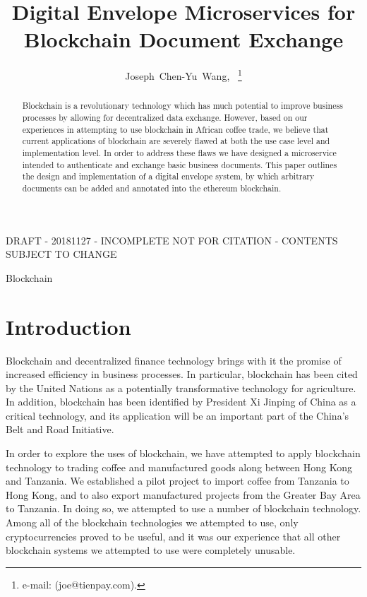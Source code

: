 \documentclass[journal]{IEEEtran}
\begin{document}
\title{Digital Envelope Microservices for Blockchain Document Exchange}
\author{Joseph~Chen-Yu~Wang,~
\thanks{e-mail: (joe@tienpay.com).}}
\maketitle

DRAFT - 20181127 - INCOMPLETE NOT FOR CITATION - CONTENTS SUBJECT TO CHANGE

\begin{abstract}
Blockchain is a revolutionary technology which has much potential to
improve business processes by allowing for decentralized data
exchange.  However, based on our experiences in attempting to use
blockchain in African coffee trade, we believe that current
applications of blockchain are severely flawed at both the use case
level and implementation level.  In order to address these flaws
we have designed a microservice intended to authenticate and exchange
basic business documents.  This paper outlines the design and
implementation of a digital envelope system, by which arbitrary
documents can be added and annotated into the ethereum blockchain.
\end{abstract}


\begin{IEEEkeywords}
Blockchain
\end{IEEEkeywords}

\section{Introduction}
Blockchain and decentralized finance technology brings with it the
promise of increased efficiency in business processes.  In particular,
blockchain has been cited by the United Nations as a potentially
transformative technology for agriculture.\cite{fao:blockchain} In
addition, blockchain has been identified by President Xi Jinping of
China as a critical technology\cite{xi}, and its application will be an
important part of the China's Belt and Road Initiative.

In order to explore the uses of blockchain, we have attempted to apply
blockchain technology to trading coffee and manufactured goods along
between Hong Kong and Tanzania.  We established a pilot project to
import coffee from Tanzania to Hong Kong, and to also export
manufactured projects from the Greater Bay Area to Tanzania.  In doing
so, we attempted to use a number of blockchain technology.  Among all
of the blockchain technologies we attempted to use, only
cryptocurrencies proved to be useful, and it was our experience that
all other blockchain systems we attempted to use were completely
unusable.
\end{document}
